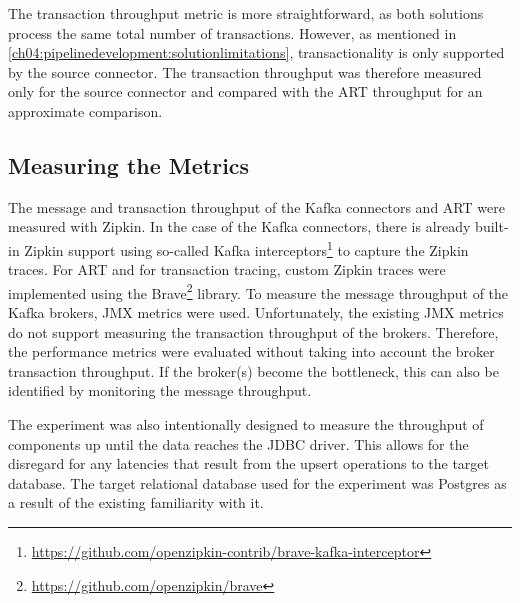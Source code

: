 The transaction throughput metric is more straightforward, as both solutions process the same total number of transactions. However, as mentioned in \ref{ch04:pipelinedevelopment:solutionlimitations}, transactionality is only supported by the source connector. The transaction throughput was therefore measured only for the source connector and compared with the \ac{ART} throughput for an approximate comparison.

\subsection{Measuring the Metrics}
The message and transaction throughput of the Kafka connectors and \ac{ART} were measured with Zipkin. In the case of the Kafka connectors, there is already built-in Zipkin support using so-called Kafka interceptors\footnote{\url{https://github.com/openzipkin-contrib/brave-kafka-interceptor}} to capture the Zipkin traces. For \ac{ART} and for transaction tracing, custom Zipkin traces were implemented using the Brave\footnote{\url{https://github.com/openzipkin/brave}} library. To measure the message throughput of the Kafka brokers, \ac{JMX} metrics were used. Unfortunately, the existing \ac{JMX} metrics do not support measuring the transaction throughput of the brokers. Therefore, the performance metrics were evaluated without taking into account the broker transaction throughput. If the broker(s) become the bottleneck, this can also be identified by monitoring the message throughput.


The experiment was also intentionally designed to measure the throughput of components up until the data reaches the \ac{JDBC} driver. This allows for the disregard for any latencies that result from the upsert operations to the target database. The target relational database used for the experiment was Postgres as a result of the existing familiarity with it.

